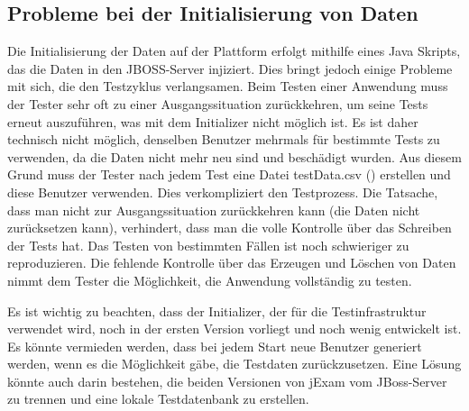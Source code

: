 \subsection{Probleme bei der Initialisierung von Daten}

Die Initialisierung der Daten auf der Plattform erfolgt mithilfe
eines Java Skripts, das die Daten in den JBOSS-Server injiziert.
Dies bringt jedoch einige Probleme mit sich, die den Testzyklus
verlangsamen. Beim Testen einer Anwendung muss der Tester sehr
oft zu einer Ausgangssituation zurückkehren, um seine Tests erneut
auszuführen, was mit dem Initializer nicht möglich ist. Es ist daher
technisch nicht möglich, denselben Benutzer mehrmals für bestimmte
Tests zu verwenden, da die Daten nicht mehr neu sind und beschädigt
wurden. Aus diesem Grund muss der Tester nach jedem Test eine Datei
testData.csv () erstellen und diese Benutzer
verwenden. Dies verkompliziert den Testprozess. Die Tatsache, dass
man nicht zur Ausgangssituation zurückkehren kann (die Daten nicht
zurücksetzen kann), verhindert, dass man die volle Kontrolle über
das Schreiben der Tests hat. Das Testen von bestimmten Fällen ist
noch schwieriger zu reproduzieren. Die fehlende Kontrolle über das
Erzeugen und Löschen von Daten nimmt dem Tester die Möglichkeit,
die Anwendung vollständig zu testen.

Es ist wichtig zu beachten, dass der Initializer, der für die
Testinfrastruktur verwendet wird, noch in der ersten Version
vorliegt und noch wenig entwickelt ist. Es könnte vermieden werden,
dass bei jedem Start neue Benutzer generiert werden, wenn es die
Möglichkeit gäbe, die Testdaten zurückzusetzen.  Eine Lösung könnte
auch darin bestehen, die beiden Versionen von jExam vom JBoss-Server
zu trennen und eine lokale Testdatenbank zu erstellen.
